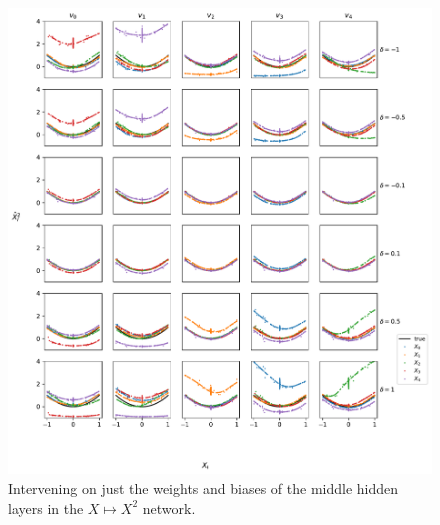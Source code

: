 \documentclass{article}
\theoremstyle{plain}
\theoremstyle{definition}
\theoremstyle{remark}
\begin{document}
\begin{figure}[ht]
    \centerline{\includegraphics[width=\textwidth]{../figures/s8_squared_intervention_middle_weights.pdf}}
    \centering
    \caption{Intervening on just the weights and biases of the middle hidden layers in the $X \mapsto X^2$ network.}\label{fig:s8_squared_intervention_middle_weights}
\end{figure}
\end{document}
